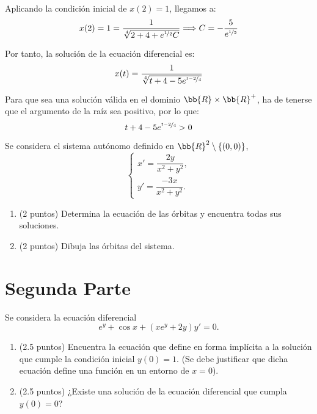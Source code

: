 \documentclass[12pt]{article}
\begin{document}
\begin{ejercicio}[6 puntos]
\begin{enumerate}
        Aplicando la condición inicial de $x(2)=1$, llegamos a:
        \begin{equation*}
            x(2)=1=\dfrac{1}{\sqrt[4]{2+4+e^{\nicefrac{1}{2}}C}}\Longrightarrow C=-\dfrac{5}{e^{\nicefrac{1}{2}}}
        \end{equation*}

        Por tanto, la solución de la ecuación diferencial es:
        \begin{equation*}
            x(t)=\dfrac{1}{\sqrt[4]{t+4-5e^{\nicefrac{t-2}{4}}}}
        \end{equation*}

        Para que sea una solución válida en el dominio $\bb{R}\times \bb{R}^+$, ha de tenerse que el argumento de la raíz sea positivo, por lo que:
        \begin{equation*}
            t+4-5e^{\nicefrac{t-2}{4}}>0
        \end{equation*}
    \end{enumerate}
\end{ejercicio}

\begin{ejercicio}[4 puntos]
    Se considera el sistema autónomo definido en $\bb{R}^2 \setminus \{(0, 0)\}$,
    \begin{equation*}
        \begin{cases}
            x' = \dfrac{2y}{x^2 + y^2},\\
            y' = \dfrac{-3x}{x^2 + y^2}.
        \end{cases}
    \end{equation*}
    \begin{enumerate}
        \item (2 puntos) Determina la ecuación de las órbitas y encuentra todas sus soluciones.
        \item (2 puntos) Dibuja las órbitas del sistema.
    \end{enumerate}
\end{ejercicio}

\section{Segunda Parte}
\begin{ejercicio}[5 puntos]
    Se considera la ecuación diferencial
    \begin{equation*}
        e^y + \cos x + (xe^y + 2y)y' = 0.
    \end{equation*}
    \begin{enumerate}
        \item (2.5 puntos) Encuentra la ecuación que define en forma implícita a la solución que cumple la condición inicial $y(0) = 1$. (Se debe justificar que dicha ecuación define una función en un entorno de $x = 0$).
        \item (2.5 puntos) ¿Existe una solución de la ecuación diferencial que cumpla $y(0) = 0$?
    \end{enumerate}
\end{ejercicio}
\end{document}
